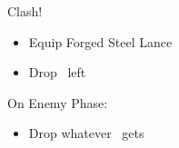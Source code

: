 \begin{battle}{Clash!}
\begin{enumerate}
{\begin{itemize}
        \item Equip Forged Steel Lance
        \item Drop \ike\ left
    \end{itemize}
    \item On Enemy Phase:
    \begin{itemize}
        \item Drop whatever \marcia\ gets
    \end{itemize}
}
\end{enumerate}
\end{battle}
